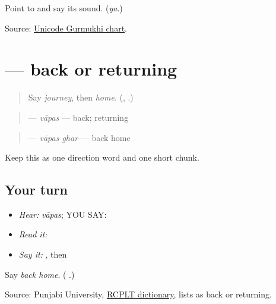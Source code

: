 \begin{tcolorbox}[breakable,colback=teal!4,colframe=teal!35!black,title={Before you move on}]
Point to \textbf{} and say its sound. (\emph{ya}.)

Source: \href{https://www.unicode.org/charts/PDF/U0A00.pdf}{Unicode Gurmukhi chart}.
\end{tcolorbox}
\section[\texorpdfstring{\pa{ਵਾਪਸ} (vapas)}{ਵਾਪਸ (vapas)}]{ — back or returning}

\label{lesson:PA-C181-vapas}



\begin{quote}
Say \emph{journey}, then \emph{home}. (\textbf{}, \textbf{}.)
\end{quote}

\begin{grammarlens}[title={Grammar Lens: one direction word}]
\begin{quote}
\textbf{} — \emph{vāpas} — back; returning
\end{quote}

\begin{quote}
\textbf{ } — \emph{vāpas ghar} — back home
\end{quote}

Keep this as one direction word and one short chunk.
\end{grammarlens}

\subsection*{Your turn}
\begin{itemize}
\raggedright
  \item \emph{Hear:} \emph{vāpas}; YOU SAY: \textbf{}
  \item \emph{Read it:} \textbf{ }
  \item \emph{Say it:} \textbf{}, then \textbf{ }
\end{itemize}

\begin{tcolorbox}[breakable,colback=teal!4,colframe=teal!35!black,title={Before you move on}]
Say \emph{back home}. (\textbf{ }.)

Source: Punjabi University, \href{https://dic.learnpunjabi.org/default.aspx?look=\%E0\%A8\%B5\%E0\%A8\%BE\%E0\%A8\%AA\%E0\%A8\%B8}{RCPLT dictionary}, lists \textbf{} as back or returning.
\end{tcolorbox}
